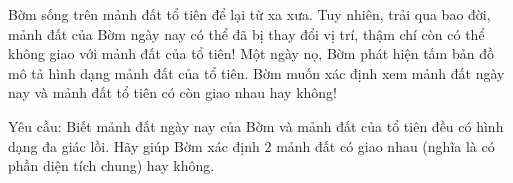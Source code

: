 Bờm sống trên mảnh đất tổ tiên để lại từ xa xưa. Tuy nhiên, trải qua bao đời, mảnh đất của Bờm ngày nay có thể đã bị thay đổi vị trí, thậm chí còn có thể không giao với mảnh đất của tổ tiên! Một ngày nọ,   Bờm phát hiện tấm bản đồ mô tả hình dạng mảnh đất của tổ tiên. Bờm muốn xác định xem mảnh đất ngày nay và mảnh đất tổ tiên có còn giao nhau hay không!  

   Yêu cầu: Biết mảnh đất ngày nay của Bờm và mảnh đất của tổ tiên đều có hình dạng đa giác lồi. Hãy giúp Bờm xác định 2 mảnh đất có giao nhau (nghĩa là có phần diện tích chung) hay không.